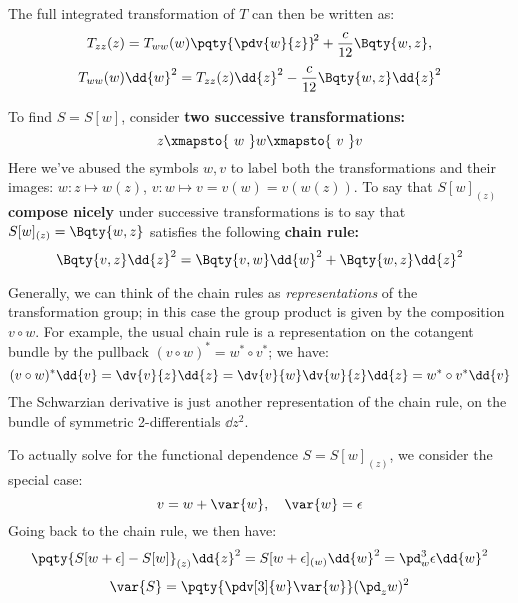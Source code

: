 \documentclass[a4paper
	,10pt
]{article}
\begin{document}
\noindent
	The full integrated transformation of $T$ can then be written as:
	\begin{equation}
		T_{zz}(z)
		= T_{ww}(w) \pqty{\pdv{w}{z}}^{\!2}
			+ \frac{c}{12} \Bqty{w,z},
	\end{equation}
	\vspace{-.6\baselineskip}
	\begin{equation}
		T_{ww}(w) \dd{w}^2
		= T_{zz}(z) \dd{z}^2
			- \frac{c}{12} \Bqty{w,z} \dd{z}^2
	\end{equation}
	
	To find $S = S[w]$, consider \textbf{two successive transformations:}
	\begin{equation}
		z \xmapsto{\ w\ } w \xmapsto{\ v\ } v
	\end{equation}
	Here we've abused the symbols $w,v$ to label both the transformations and their images: $w\colon z\mapsto w(z)$, $v\colon w\mapsto v = v(w) = v(w(z))$. 
	To say that \textbf{$S[w]_{(z)}$ compose nicely} under successive transformations is to say that $S[w]_{(z)} = \Bqty{w,z}$ satisfies the following \textbf{chain rule:}
	\begin{equation}
		\Bqty{v,z} \dd{z}^2
		= \Bqty{v,w} \dd{w}^2
		+ \Bqty{w,z} \dd{z}^2
	\label{eq:schwarzian_chain}
	\end{equation}
	
	Generally, we can think of the chain rules as \textit{representations} of the transformation group; in this case the group product is given by the composition $v\circ w$. For example, the usual chain rule is a representation on the cotangent bundle by the pullback $
		(v\circ w)^*
		= w^* \circ v^*
	$; we have:
	\begin{equation}
		(v\circ w)^* \dd{v}
		= \dv{v}{z} \dd{z}
		= \dv{v}{w} \dv{w}{z} \dd{z}
		= w^* \circ v^* \dd{v}
	\end{equation}
	The Schwarzian derivative is just another representation of the chain rule, on the bundle of symmetric 2-differentials $\dd{z}^2$. 
	
	To actually solve for the functional dependence $S = S[w]_{(z)}$, we consider the special case:
	\begin{equation}
		v = w + \var{w},
	\quad \var{w} = \epsilon
	\end{equation}
	Going back to the chain rule, we then have:
	\begin{equation}
		\pqty{S[w + \epsilon] - S[w]}_{(z)} \dd{z}^2
		= S[w + \epsilon]_{(w)} \dd{w}^2
		= \pd_w^3 \epsilon \dd{w}^2
	\end{equation}
	\vspace{-.8\baselineskip}
	\begin{equation}
		\var{S}
		= \pqty{\pdv[3]{w} \var{w}} (\pd_z w)^2
	\label{eq:functional_eq}
	\end{equation}
	
\end{document}
